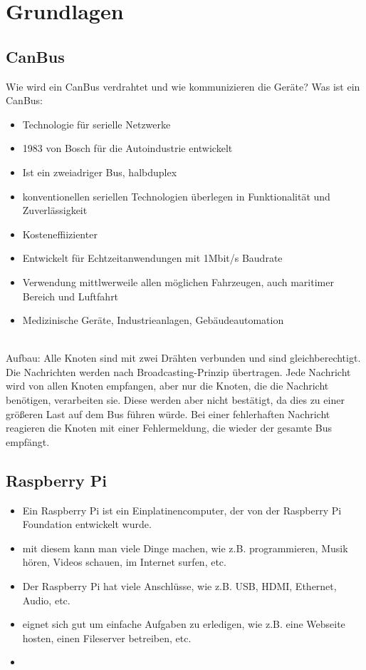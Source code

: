 \chapter{Grundlagen}


\section{CanBus}
Wie wird ein CanBus verdrahtet und wie kommunizieren die Geräte?
Was ist ein CanBus:
\begin{itemize}
    \item Technologie für serielle Netzwerke
    \item 1983 von Bosch für die Autoindustrie entwickelt
    \item Ist ein zweiadriger Bus, halbduplex
    \item konventionellen seriellen Technologien überlegen in Funktionalität und Zuverlässigkeit
    \item Kosteneffiizienter
    \item Entwickelt für Echtzeitanwendungen mit 1Mbit/s Baudrate
    \item Verwendung mittlwerweile allen möglichen Fahrzeugen, auch maritimer Bereich und Luftfahrt
    \item Medizinische Geräte, Industrieanlagen, Gebäudeautomation
\end{itemize}

\cite[Seiten 2-10]{voss2008comprehensible}
\\
Aufbau:
Alle Knoten sind mit zwei Drähten verbunden und sind gleichberechtigt.
\cite[Seite 132]{voss2008comprehensible}
\\
Die Nachrichten werden nach Broadcasting-Prinzip übertragen. Jede Nachricht wird von allen Knoten empfangen, 
aber nur die Knoten, die die Nachricht benötigen, verarbeiten sie. Diese werden aber nicht bestätigt,
da dies zu einer größeren Last auf dem Bus führen würde. Bei einer fehlerhaften Nachricht reagieren
die Knoten mit einer Fehlermeldung, die wieder der gesamte Bus empfängt.
\cite[Seite 80]{voss2008comprehensible}


\section{Raspberry Pi}
\begin{itemize}
    \item Ein Raspberry Pi ist ein Einplatinencomputer, der von der Raspberry Pi Foundation entwickelt wurde.
    \item mit diesem kann man viele Dinge machen, wie z.B. programmieren, Musik hören, Videos schauen, im Internet surfen, etc.
    \item Der Raspberry Pi hat viele Anschlüsse, wie z.B. USB, HDMI, Ethernet, Audio, etc.
    \item eignet sich gut um einfache Aufgaben zu erledigen, wie z.B. eine Webseite hosten, einen Fileserver betreiben, etc.
    \item 
\end{itemize}

